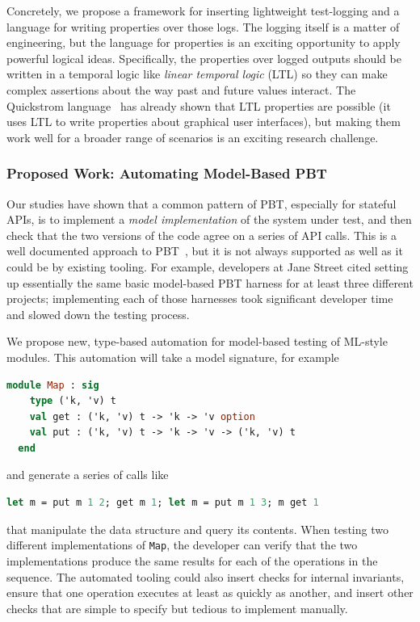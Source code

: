 Concretely, we propose a framework for inserting lightweight test-logging and a
language for writing properties over those logs. The logging itself is a matter
of engineering, but the language for properties is an exciting opportunity to
apply powerful logical ideas. Specifically, the properties over logged outputs
should be written in a temporal logic like {\em linear temporal logic} (LTL) so
they can make complex assertions about the way past and future values interact.
The Quickstrom language~\cite{oconnor_quickstrom_2022} has already shown that
LTL properties are possible (it uses LTL to write properties about graphical
user interfaces), but making them work well for a broader range of scenarios is
an exciting research challenge.

\subsubsection{Proposed Work: Automating Model-Based PBT}
Our studies have shown that a common pattern of PBT, especially for stateful
APIs, is to implement a {\em model implementation} of the system under test, and
then check that the two versions of the code agree on a series of API calls.
This is a well documented approach to PBT~\cite{hughes_experiences_2016}, but it
is not always supported as well as it could be by existing tooling. For example,
developers at Jane Street cited setting up essentially the same basic
model-based PBT harness for at least three different projects; implementing each
of those harnesses took significant developer time and slowed down the testing
process.

We propose new, type-based automation for model-based testing of ML-style
modules. This automation will take a model signature, for example
\begin{lstlisting}[language=Caml]
  module Map : sig
    type ('k, 'v) t
    val get : ('k, 'v) t -> 'k -> 'v option
    val put : ('k, 'v) t -> 'k -> 'v -> ('k, 'v) t
  end
\end{lstlisting}
and generate a series of calls like
\begin{lstlisting}[language=Caml]
  let m = put m 1 2; get m 1; let m = put m 1 3; m get 1
\end{lstlisting}
that manipulate the data structure and query its contents. When testing two
different implementations of \lstinline{Map}, the developer can verify that the
two implementations produce the same results for each of the operations in the
sequence. The automated tooling could also insert checks for internal
invariants, ensure that one operation executes at least as quickly as another,
and insert other checks that are simple to specify but tedious to implement
manually.


